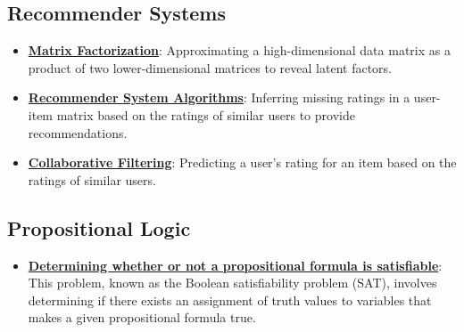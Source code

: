 \documentclass{article}%
\begin{document}
%
\subsection{Recommender Systems}%
\label{subsec:RecommenderSystems}%
\begin{itemize}[leftmargin=*]%
\item \href{https://purdue.brightspace.com/d2l/common/assets/pdfjs-d2l-dist/1.0.14-legacy/web/viewer.html?file=\%2Fcontent\%2Fenforced\%2F1095467-wl.202510.CS.24300.001\%2F11L2-svd-pca-recommender.pdf\%3Fou\%3D1095467\&lang=en-us\&container=d2l-fileviewer-rendered-pdf\&fullscreen=d2l-fileviewer-rendered-pdf-dialog\&height=667#page=13}{\textbf{Matrix Factorization}}: Approximating a high-dimensional data matrix as a product of two lower-dimensional matrices to reveal latent factors.%
\item \href{https://purdue.brightspace.com/d2l/common/assets/pdfjs-d2l-dist/1.0.14-legacy/web/viewer.html?file=\%2Fcontent\%2Fenforced\%2F1095467-wl.202510.CS.24300.001\%2F11L2-svd-pca-recommender.pdf\%3Fou\%3D1095467\&lang=en-us\&container=d2l-fileviewer-rendered-pdf\&fullscreen=d2l-fileviewer-rendered-pdf-dialog\&height=667#page=31}{\textbf{Recommender System Algorithms}}: Inferring missing ratings in a user-item matrix based on the ratings of similar users to provide recommendations.%
\item \href{https://purdue.brightspace.com/d2l/common/assets/pdfjs-d2l-dist/1.0.14-legacy/web/viewer.html?file=\%2Fcontent\%2Fenforced\%2F1095467-wl.202510.CS.24300.001\%2F11L2-svd-pca-recommender.pdf\%3Fou\%3D1095467\&lang=en-us\&container=d2l-fileviewer-rendered-pdf\&fullscreen=d2l-fileviewer-rendered-pdf-dialog\&height=667#page=33}{\textbf{Collaborative Filtering}}: Predicting a user's rating for an item based on the ratings of similar users.%
\end{itemize}

%
\subsection{Propositional Logic}%
\label{subsec:PropositionalLogic}%
\begin{itemize}[leftmargin=*]%
\item \href{https://purdue.brightspace.com/d2l/common/assets/pdfjs-d2l-dist/1.0.14-legacy/web/viewer.html?file=\%2Fcontent\%2Fenforced\%2F1095467-wl.202510.CS.24300.001\%2F13L1-Logic.pdf\%3Fou\%3D1095467\&lang=en-us\&container=d2l-fileviewer-rendered-pdf\&fullscreen=d2l-fileviewer-rendered-pdf-dialog\&height=667#page=15}{\textbf{Determining whether or not a propositional formula is satisfiable}}: This problem, known as the Boolean satisfiability problem (SAT), involves determining if there exists an assignment of truth values to variables that makes a given propositional formula true.%
\end{itemize}
\end{document}
